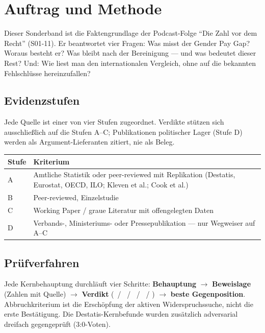 
\section{Auftrag und Methode}

Dieser Sonderband ist die Faktengrundlage der Podcast-Folge \enquote{Die Zahl vor
dem Recht} (S01-11). Er beantwortet vier Fragen: Was misst der Gender Pay Gap?
Woraus besteht er? Was bleibt nach der Bereinigung --- und was bedeutet dieser
Rest? Und: Wie liest man den internationalen Vergleich, ohne auf die bekannten
Fehlschl\"usse hereinzufallen?

\subsection{Evidenzstufen}

Jede Quelle ist einer von vier Stufen zugeordnet. Verdikte st\"utzen sich
ausschlie\ss lich auf die Stufen A--C; Publikationen politischer Lager (Stufe D)
werden als Argument-Lieferanten zitiert, nie als Beleg.

\begin{longtable}{@{}l L{11.5cm}@{}}
\toprule
\textbf{Stufe} & \textbf{Kriterium} \\
\midrule
A & Amtliche Statistik oder peer-reviewed mit Replikation (Destatis, Eurostat, OECD, ILO; Kleven et al.; Cook et al.) \\
B & Peer-reviewed, Einzelstudie \\
C & Working Paper / graue Literatur mit offengelegten Daten \\
D & Verbands-, Ministeriums- oder Pressepublikation --- nur Wegweiser auf A--C \\
\bottomrule
\end{longtable}

\subsection{Pr\"ufverfahren}

Jede Kernbehauptung durchl\"auft vier Schritte: \textbf{Behauptung} $\rightarrow$
\textbf{Beweislage} (Zahlen mit Quelle) $\rightarrow$ \textbf{Verdikt}
(\vbelegt\ / \vteil\ / \virref\ / \vfalsch\ / \vunent) $\rightarrow$
\textbf{beste Gegenposition}. Abbruchkriterium ist die Ersch\"opfung der aktiven
Widerspruchssuche, nicht die erste Best\"atigung. Die Destatis-Kernbefunde wurden
zus\"atzlich adversarial dreifach gegengepr\"uft (3:0-Voten).

